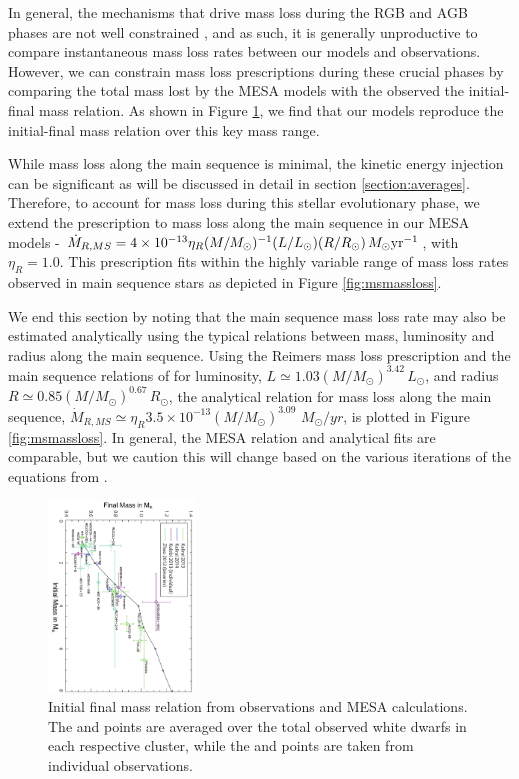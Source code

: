 \documentclass[fleqn,usenatbib]{mnras}
\begin{document}
In general, the mechanisms that drive mass loss during the RGB and AGB phases are not well constrained \citep{ventura2008b,karakas2007,marigo2012}, and as such, it is generally unproductive to compare instantaneous mass loss rates between our models and observations.
However, we can constrain mass loss prescriptions during these crucial phases by comparing the total mass lost by the MESA models with the observed the initial-final mass relation.   As shown in Figure \ref{fig:ifrelation}, we find that our models reproduce the initial-final mass relation over this key mass range.

While mass loss along the main sequence is minimal, the kinetic energy injection can be significant as will be discussed in detail in section \ref{section:averages}.
Therefore, to account for mass loss during this stellar evolutionary phase, we extend the \cite{reimers1975} prescription to mass loss along the main sequence in our MESA models - $\dot{M}_{R,MS} = 4 \times 10^{-13}  \eta_R (M/M_\odot)^{-1} (L/L_\odot) (R/R_\odot) \, M_\odot {\rm yr^{-1}}$, with $\eta_R = 1.0$.  
 This prescription fits within the highly variable range of mass loss rates observed in main sequence stars as depicted in Figure \ref{fig:msmassloss}.  

We end this section by noting that the main sequence mass loss rate may also be estimated analytically using the typical relations between mass, luminosity and radius along the main sequence.  Using the Reimers mass loss prescription and the main sequence relations of \cite{demircan1991} for luminosity, $L \simeq 1.03 (M/M_\odot)^{3.42} \, L_\odot$, and radius $R \simeq 0.85 (M/M_\odot)^{0.67} \, R_\odot$,
the analytical relation for mass loss along the main sequence, $\dot{M}_{R,MS} \simeq \eta_R 3.5 \times 10^{-13}(M/M_\odot)^{3.09} \, \, M_\odot/yr$, is plotted in Figure \ref{fig:msmassloss}.  In general, the MESA relation and analytical fits are comparable, but we caution this will change based on the various iterations of the equations from \cite{demircan1991}.

\begin{figure}
\centering\includegraphics[width=0.35\textwidth, angle=90]{if_mod2.pdf}
\caption{ Initial final mass relation from observations and MESA calculations. The \citealt{kalirai2013a} and \citealt{kalirai2013b} points are averaged over the total observed white dwarfs in each respective cluster, while the \citealt{kulebi2013} and \citealt{zhao2012} points are taken from individual observations.}
\label{fig:ifrelation}
\end{figure} 
\end{document}
